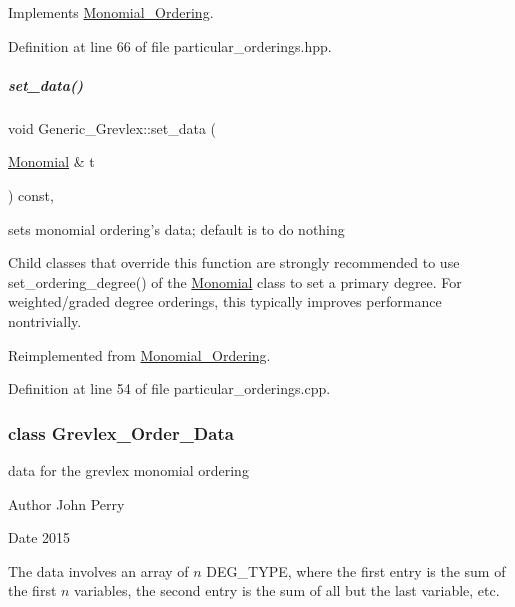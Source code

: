 Implements \hyperlink{group__orderinggroup_a9bc3155fc98b4d40c26118fa2114b827}{Monomial\+\_\+\+Ordering}.



Definition at line 66 of file particular\+\_\+orderings.\+hpp.

\mbox{\label{group__orderinggroup_a14c344858da03d16c8019afdae3da5dc}} 
\subparagraph{\texorpdfstring{set\+\_\+data()}{set\_data()}}
{\footnotesize\ttfamily void Generic\+\_\+\+Grevlex\+::set\+\_\+data (\begin{DoxyParamCaption}\item[{\hyperlink{group__polygroup_class_monomial}{Monomial} \&}]{t }\end{DoxyParamCaption}) const\hspace{0.3cm}{\ttfamily [override]}, {\ttfamily [virtual]}}



sets monomial ordering's data; default is to do nothing 

Child classes that override this function are strongly recommended to use set\+\_\+ordering\+\_\+degree() of the \hyperlink{group__polygroup_class_monomial}{Monomial} class to set a primary degree. For weighted/graded degree orderings, this typically improves performance nontrivially. 

Reimplemented from \hyperlink{group__orderinggroup_a22b08dffd1cdf3a655ca18d604cfcee1}{Monomial\+\_\+\+Ordering}.



Definition at line 54 of file particular\+\_\+orderings.\+cpp.

\label{class_grevlex___order___data}
\subsubsection{class Grevlex\+\_\+\+Order\+\_\+\+Data}
data for the grevlex monomial ordering 

\begin{DoxyAuthor}{Author}
John Perry 
\end{DoxyAuthor}
\begin{DoxyDate}{Date}
2015
\end{DoxyDate}
The data involves an array of $n$ {\ttfamily D\+E\+G\+\_\+\+T\+Y\+PE}, where the first entry is the sum of the first $n$ variables, the second entry is the sum of all but the last variable, etc. 

